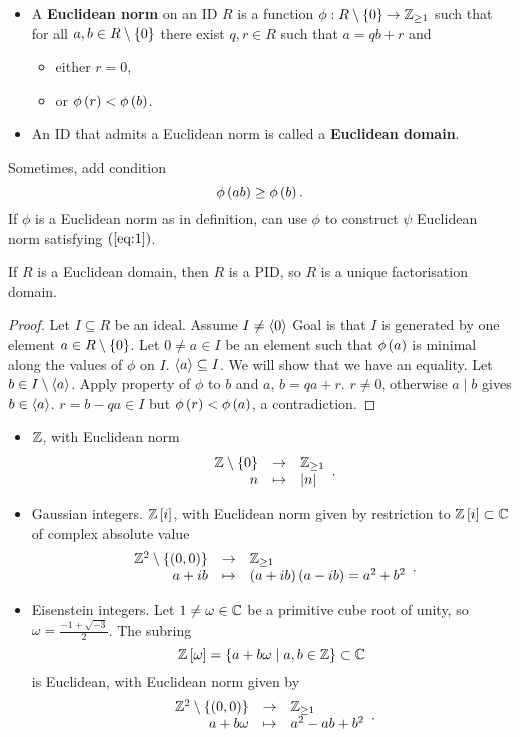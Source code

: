 \begin{definition}
\hfill
\begin{itemize}
\item A \textbf{Euclidean norm} on an ID $ R $ is a function $ \phi : R \setminus \left\{ 0 \right\} \to \mathbb{Z}_{\ge 1} $ such that for all $ a, b \in R \setminus \left\{ 0 \right\} $ there exist $ q, r \in R $ such that $ a = qb + r $ and
\begin{itemize}
\item either $ r = 0 $,
\item or $ \phi\left( r \right) < \phi\left( b \right) $.
\end{itemize}
\item An ID that admits a Euclidean norm is called a \textbf{Euclidean domain}.
\end{itemize}
\end{definition}

Sometimes, add condition
\begin{equation}
\label{eq:1}
\phi\left( ab \right) \ge \phi\left( b \right).
\end{equation}
If $ \phi $ is a Euclidean norm as in definition, can use $ \phi $ to construct $ \psi $ Euclidean norm satisfying $ \left( \ref{eq:1} \right) $.

\begin{theorem}
If $ R $ is a Euclidean domain, then $ R $ is a PID, so $ R $ is a unique factorisation domain.
\end{theorem}


\begin{proof}
Let $ I \subseteq R $ be an ideal. Assume $ I \ne \left\langle 0 \right\rangle $ Goal is that $ I $ is generated by one element $ a \in R \setminus \left\{ 0 \right\} $. Let $ 0 \ne a \in I $ be an element such that $ \phi\left( a \right) $ is minimal along the values of $ \phi $ on $ I $. $ \left\langle a \right\rangle \subseteq I $. We will show that we have an equality. Let $ b \in I \setminus \left\langle a \right\rangle $. Apply property of $ \phi $ to $ b $ and $ a $, $ b = qa + r $. $ r \ne 0 $, otherwise $ a \mid b $ gives $ b \in \left\langle a \right\rangle $. $ r = b - qa \in I $ but $ \phi\left( r \right) < \phi\left( a \right) $, a contradiction.
\end{proof}

\begin{example*}
\hfill
\begin{itemize}
\item $ \mathbb{Z} $, with Euclidean norm
$$ \function{\Z \setminus \cb{0}}{\Z_{\ge 1}}{n}{\abs{n}}. $$
\item Gaussian integers. $ \mathbb{Z}\left[ i \right] $, with Euclidean norm given by restriction to $ \mathbb{Z}\left[ i \right] \subset \mathbb{C} $ of complex absolute value
$$ \function{\Z^2 \setminus \cb{\rb{0, 0}}}{\Z_{\ge 1}}{a + ib}{\rb{a + ib}\rb{a - ib} = a^2 + b^2}. $$
\item Eisenstein integers. Let $ 1 \ne \omega \in \mathbb{C} $ be a primitive cube root of unity, so $ \omega = \tfrac{-1 + \sqrt{-3}}{2} $. The subring
$$ \mathbb{Z}\left[ \omega \right] = \left\{ a + b\omega \mid a, b \in \mathbb{Z} \right\} \subset \mathbb{C} $$
is Euclidean, with Euclidean norm given by
$$ \function{\Z^2 \setminus \cb{\rb{0, 0}}}{\Z_{\ge 1}}{a + b\omega}{a^2 - ab + b^2}. $$
\end{itemize}
\end{example*}

